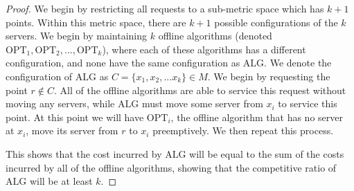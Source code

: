 \begin{proof}
    We begin by restricting all requests to a sub-metric space which has $k+1$ points. Within this metric space, there are $k+1$ possible configurations of the $k$ servers. We begin by maintaining $k$ offline algorithms (denoted $\mathrm{OPT}_1, \mathrm{OPT}_2, ..., \mathrm{OPT}_k$), where each of these algorithms has a different configuration, and none have the same configuration as $\mathrm{ALG}$. We denote the configuration of $\mathrm{ALG}$ as $C = \{ x_1, x_2, ...x_k \} \in M$. We begin by requesting the point $r \not \in C$. All of the offline algorithms are able to service this request without moving any servers, while $\mathrm{ALG}$ must move some server from $x_i$ to service this point. At this point we will have $\mathrm{OPT}_i$, the offline algorithm that has no server at $x_i$, move its server from $r$ to $x_i$ preemptively. We then repeat this process.

    This shows that the cost incurred by $\mathrm{ALG}$ will be equal to the sum of the costs incurred by all of the offline algorithms, showing that the competitive ratio of $\mathrm{ALG}$ will be at least $k$.
\end{proof}
